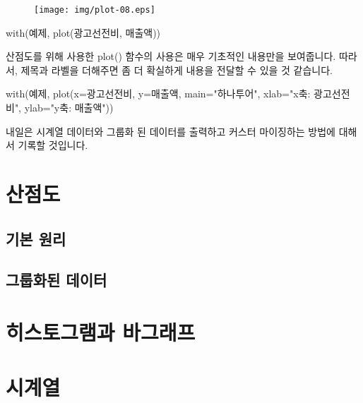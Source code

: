 \begin{figure}
\begin{center}
\texttt{[image: img/plot-08.eps]}
\end{center}
\end{figure}

\begin{Schunk}
\begin{Soutput}
with(예제, plot(광고선전비, 매출액))
\end{Soutput}
\end{Schunk}

산점도를 위해 사용한 plot() 함수의 사용은 매우 기초적인 내용만을 보여줍니다. 
따라서, 제목과 라벨을 더해주면 좀 더 확실하게 내용을 전달할 수 있을 것 같습니다. 

\begin{Schunk}
\begin{Soutput}
with(예제, plot(x=광고선전비, y=매출액, main="하나투어", xlab="x축: 광고선전비", ylab="y축: 매출액"))
\end{Soutput}
\end{Schunk}

내일은 시계열 데이터와 그룹화 된 데이터를 출력하고 커스터 마이징하는 방법에 대해서 기록할 것입니다.

\section{산점도}

\subsection{기본 원리}

\subsection{그룹화된 데이터}


\section{히스토그램과 바그래프}


\section{시계열}


